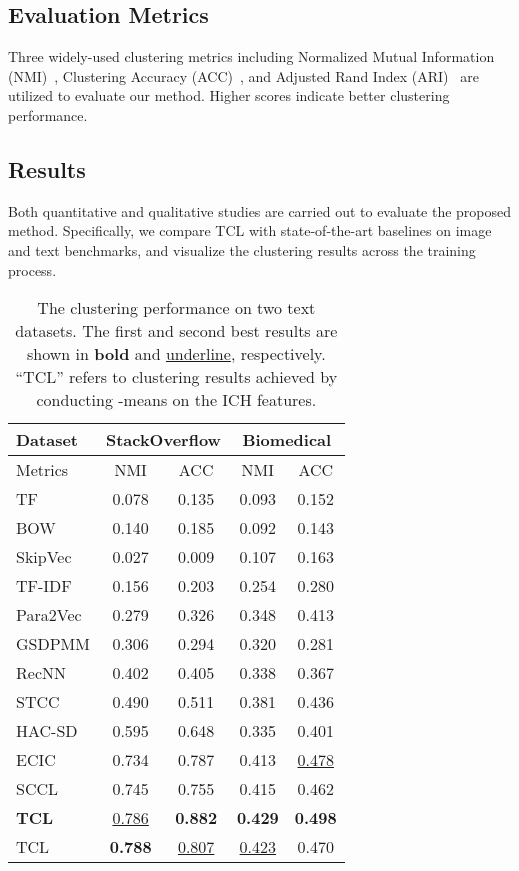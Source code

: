 \subsection{Evaluation Metrics}

Three widely-used clustering metrics including Normalized Mutual Information (NMI)~\citep{NMI}, Clustering Accuracy (ACC)~\citep{ACC}, and Adjusted Rand Index (ARI)~\citep{ARI} are utilized to evaluate our method. Higher scores indicate better clustering performance.

\subsection{Results}

Both quantitative and qualitative studies are carried out to evaluate the proposed method. Specifically, we compare TCL with state-of-the-art baselines on image and text benchmarks, and visualize the clustering results across the training process.

\begin{table}[t]
\centering
\caption{The clustering performance on two text datasets. The first and second best results are shown in \textbf{bold} and \underline{underline}, respectively. ``TCL'' refers to clustering results achieved by conducting -means on the ICH features.}

\begin{tabular}{@{}lcccc@{}}
\toprule
Dataset &
  \multicolumn{2}{c}{StackOverflow} &
  \multicolumn{2}{c}{Biomedical} \\ \midrule
Metrics &
  \multicolumn{1}{c}{NMI} &
  \multicolumn{1}{c}{ACC} &
  \multicolumn{1}{c}{NMI} &
  \multicolumn{1}{c}{ACC} \\ \midrule

TF & 0.078 & 0.135 & 0.093 & 0.152 \\
BOW & 0.140 & 0.185 & 0.092 & 0.143 \\
SkipVec & 0.027 & 0.009 & 0.107 & 0.163 \\
TF-IDF & 0.156 & 0.203 & 0.254 & 0.280  \\
Para2Vec & 0.279 & 0.326 & 0.348 & 0.413 \\
GSDPMM & 0.306 & 0.294 & 0.320 & 0.281 \\
RecNN & 0.402 & 0.405 & 0.338 & 0.367 \\
STCC & 0.490 & 0.511 & 0.381 & 0.436 \\
HAC-SD & 0.595 & 0.648 & 0.335 & 0.401 \\
ECIC & 0.734 & 0.787 & 0.413 & \underline{0.478} \\
SCCL & 0.745 & 0.755 & 0.415 & 0.462 \\
\hline
\textbf{TCL} & \underline{0.786} & \textbf{0.882} & \textbf{0.429} & \textbf{0.498} \\
TCL & \textbf{0.788} & \underline{0.807} & \underline{0.423}  & 0.470 \\ \bottomrule
\end{tabular}

\label{tab:result_text}
\end{table}

